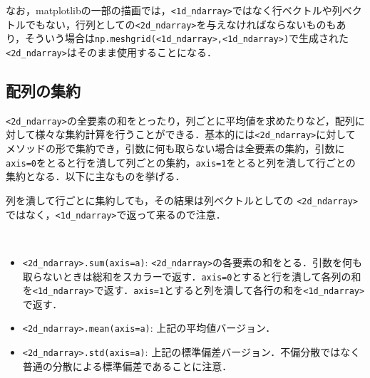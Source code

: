 なお，matplotlibの一部の描画では，\texttt{<1d\_ndarray>}ではなく行ベクトルや列ベクトルでもない，行列としての\texttt{<2d\_ndarray>}を与えなければならないものもあり，そういう場合は\texttt{np.meshgrid(<1d\_ndarray>,<1d\_ndarray>)}で生成された\texttt{<2d\_ndarray>}はそのまま使用することになる．

\subsection{配列の集約}

\texttt{<2d\_ndarray>}の全要素の和をとったり，列ごとに平均値を求めたりなど，配列に対して様々な集約計算を行うことができる．基本的には\texttt{<2d\_ndarray>}に対してメソッドの形で集約でき，引数に何も取らない場合は全要素の集約，引数に\texttt{axis=0}をとると行を潰して列ごとの集約，\texttt{axis=1}をとると列を潰して行ごとの集約となる．以下に主なものを挙げる．

\begin{rem}
列を潰して行ごとに集約しても，その結果は列ベクトルとしての	\texttt{<2d\_ndarray>}ではなく，\texttt{<1d\_ndarray>}で返って来るので注意．
\end{rem}

\begin{gram}　
\begin{itemize}
\item \texttt{<2d\_ndarray>.sum(axis=a)}: \texttt{<2d\_ndarray>}の各要素の和をとる．引数を何も取らないときは総和をスカラーで返す．\texttt{axis=0}とすると行を潰して各列の和を\texttt{<1d\_ndarray>}で返す．\texttt{axis=1}とすると列を潰して各行の和を\texttt{<1d\_ndarray>}で返す．
\item \texttt{<2d\_ndarray>.mean(axis=a)}: 上記の平均値バージョン．
\item \texttt{<2d\_ndarray>.std(axis=a)}: 上記の標準偏差バージョン．不偏分散ではなく普通の分散による標準偏差であることに注意．
\end{itemize}
\end{gram}

\begin{cod}[\texttt{num13.py}]　
}]{code/num13.py}
\vspace{-10pt}
\begin{lstlisting}
A_sum_all=136
A_mean_bycol=[ 7.  8.  9. 10.]
A_std_byrow=[1.11803399 1.11803399 1.11803399 1.11803399]
\end{lstlisting}
\end{cod}
\vspace{-10pt}

